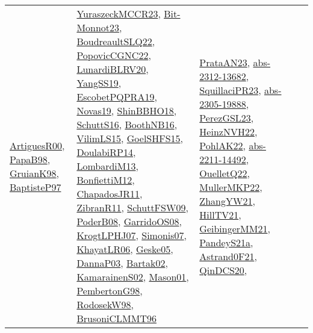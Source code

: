 {\begin{longtable}{lp{3cm}>{\raggedright}p{6cm}>{\raggedright}p{6cm}p{8cm}}
\href{articles/ArtiguesR00.pdf}{ArtiguesR00}\cite{ArtiguesR00}, \href{articles/PapaB98.pdf}{PapaB98}\cite{PapaB98}, \href{papers/GruianK98.pdf}{GruianK98}\cite{GruianK98}, \href{papers/BaptisteP97.pdf}{BaptisteP97}\cite{BaptisteP97} & \href{articles/YuraszeckMCCR23.pdf}{YuraszeckMCCR23}\cite{YuraszeckMCCR23}, \href{papers/Bit-Monnot23.pdf}{Bit-Monnot23}\cite{Bit-Monnot23}, \href{papers/BoudreaultSLQ22.pdf}{BoudreaultSLQ22}\cite{BoudreaultSLQ22}, \href{papers/PopovicCGNC22.pdf}{PopovicCGNC22}\cite{PopovicCGNC22}, \href{articles/LunardiBLRV20.pdf}{LunardiBLRV20}\cite{LunardiBLRV20}, \href{papers/YangSS19.pdf}{YangSS19}\cite{YangSS19}, \href{articles/EscobetPQPRA19.pdf}{EscobetPQPRA19}\cite{EscobetPQPRA19}, \href{articles/Novas19.pdf}{Novas19}\cite{Novas19}, \href{articles/ShinBBHO18.pdf}{ShinBBHO18}\cite{ShinBBHO18}, \href{papers/SchuttS16.pdf}{SchuttS16}\cite{SchuttS16}, \href{papers/BoothNB16.pdf}{BoothNB16}\cite{BoothNB16}, \href{papers/VilimLS15.pdf}{VilimLS15}\cite{VilimLS15}, \href{articles/GoelSHFS15.pdf}{GoelSHFS15}\cite{GoelSHFS15}, \href{papers/DoulabiRP14.pdf}{DoulabiRP14}\cite{DoulabiRP14}, \href{papers/LombardiM13.pdf}{LombardiM13}\cite{LombardiM13}, \href{papers/BonfiettiM12.pdf}{BonfiettiM12}\cite{BonfiettiM12}, \href{papers/ChapadosJR11.pdf}{ChapadosJR11}\cite{ChapadosJR11}, \href{papers/ZibranR11.pdf}{ZibranR11}\cite{ZibranR11}, \href{papers/SchuttFSW09.pdf}{SchuttFSW09}\cite{SchuttFSW09}, \href{papers/PoderB08.pdf}{PoderB08}\cite{PoderB08}, \href{articles/GarridoOS08.pdf}{GarridoOS08}\cite{GarridoOS08}, \href{papers/KrogtLPHJ07.pdf}{KrogtLPHJ07}\cite{KrogtLPHJ07}, \href{articles/Simonis07.pdf}{Simonis07}\cite{Simonis07}, \href{articles/KhayatLR06.pdf}{KhayatLR06}\cite{KhayatLR06}, \href{papers/Geske05.pdf}{Geske05}\cite{Geske05}, \href{papers/DannaP03.pdf}{DannaP03}\cite{DannaP03}, \href{papers/Bartak02.pdf}{Bartak02}\cite{Bartak02}, \href{papers/KamarainenS02.pdf}{KamarainenS02}\cite{KamarainenS02}, \href{articles/Mason01.pdf}{Mason01}\cite{Mason01}, \href{papers/PembertonG98.pdf}{PembertonG98}\cite{PembertonG98}, \href{papers/RodosekW98.pdf}{RodosekW98}\cite{RodosekW98}, \href{papers/BrusoniCLMMT96.pdf}{BrusoniCLMMT96}\cite{BrusoniCLMMT96} & \href{articles/PrataAN23.pdf}{PrataAN23}\cite{PrataAN23}, \href{articles/abs-2312-13682.pdf}{abs-2312-13682}\cite{abs-2312-13682}, \href{papers/SquillaciPR23.pdf}{SquillaciPR23}\cite{SquillaciPR23}, \href{articles/abs-2305-19888.pdf}{abs-2305-19888}\cite{abs-2305-19888}, \href{papers/PerezGSL23.pdf}{PerezGSL23}\cite{PerezGSL23}, \href{articles/HeinzNVH22.pdf}{HeinzNVH22}\cite{HeinzNVH22}, \href{articles/PohlAK22.pdf}{PohlAK22}\cite{PohlAK22}, \href{articles/abs-2211-14492.pdf}{abs-2211-14492}\cite{abs-2211-14492}, \href{papers/OuelletQ22.pdf}{OuelletQ22}\cite{OuelletQ22}, \href{articles/MullerMKP22.pdf}{MullerMKP22}\cite{MullerMKP22}, \href{articles/ZhangYW21.pdf}{ZhangYW21}\cite{ZhangYW21}, \href{papers/HillTV21.pdf}{HillTV21}\cite{HillTV21}, \href{papers/GeibingerMM21.pdf}{GeibingerMM21}\cite{GeibingerMM21}, \href{articles/PandeyS21a.pdf}{PandeyS21a}\cite{PandeyS21a}, \href{papers/Astrand0F21.pdf}{Astrand0F21}\cite{Astrand0F21}, \href{articles/QinDCS20.pdf}{QinDCS20}\cite{QinDCS20}, 
\end{longtable}}

